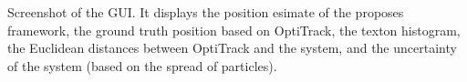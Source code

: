 \label{fig:gui}
Screenshot of the GUI. It displays
    the position esimate of the proposes framework, the ground truth
    position based on OptiTrack, the texton histogram, the Euclidean
    distances between OptiTrack and the system, and the uncertainty of
    the system (based on the spread of particles).%
